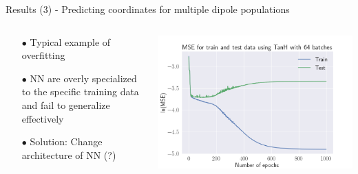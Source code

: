 \documentclass[aspectratio=169]{beamer}
\begin{document}
\begin{frame}{Results (3) - Predicting coordinates for multiple dipole populations}
    \begin{columns}
        \begin{column}{0.5\textwidth}
            \begin{itemize}
              \item[$\bullet$] Typical example of overfitting
              \item[$\bullet$] NN are overly specialized to the specific training data and fail to generalize effectively
              \item[$\bullet$] Solution: Change architecture of NN (?)
            \end{itemize}
        \end{column}
        \begin{column}{0.5\textwidth}
            \includegraphics[width=\textwidth]{figures/MSE_10000_11may_MSE_area_w_amplitude_1000_SGD_lr1.5_wd0.1_mom0.35_bs64_TanH_64_1000_N_dipoles_2.png}
        \end{column}
    \end{columns}
\end{frame}
\end{document}
